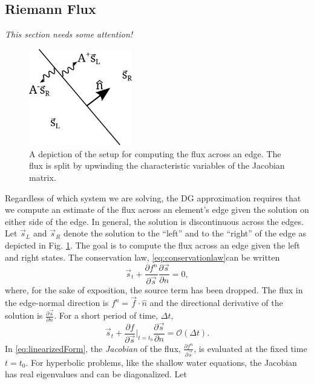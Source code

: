 \documentclass{softwaremanual}
\begin{document}
\subsection{Riemann Flux}
\textit{This section needs some attention!}
\begin{figure}
\begin{center}
\includegraphics[width=0.4\textwidth]{figures/normalflux.png}
\caption{ A depiction of the setup for computing the flux across an edge. The flux is split by upwinding the characteristic variables of the Jacobian matrix. }\label{fig:normalflux}
\end{center}
\end{figure}
Regardless of which system we are solving, the DG approximation requires that we compute an estimate of the flux across an element's edge given the solution on either side of the edge. In general, the solution is discontinuous across the edges. Let $\vec{s}_L$ and $\vec{s}_R$ denote the solution to the ``left'' and to the ``right'' of the edge as depicted in Fig. \ref{fig:normalflux}. The goal is to compute the flux across an edge given the left and right states. The conservation law, \eqref{eq:conservationlaw}can be written
\begin{equation}
\vec{s}_t + \frac{\partial f^n}{\partial \vec{s}}\frac{\partial \vec{s}}{\partial n} = 0,
\end{equation}
where, for the sake of exposition, the source term has been dropped. The flux in the edge-normal direction is $f^n = \vec{f} \cdot \hat{n}$ and the directional derivative of the solution is $\frac{\partial \vec{s}}{\partial n}$. For a short period of time, $\Delta t$,
\begin{equation}
\vec{s}_t + \frac{\partial f}{\partial \vec{s}}|_{t=t_0} \frac{\partial \vec{s}}{\partial n}  = \mathcal{O}(\Delta t). \label{eq:linearizedForm}
\end{equation}
In \eqref{eq:linearizedForm}, the \textit{Jacobian} of the flux, $\frac{\partial f^n}{\partial \vec{s}}$, is evaluated at the fixed time $t=t_0$. For hyperbolic problems, like the shallow water equations, the Jacobian has real eigenvalues and can be diagonalized. Let
\end{document}
